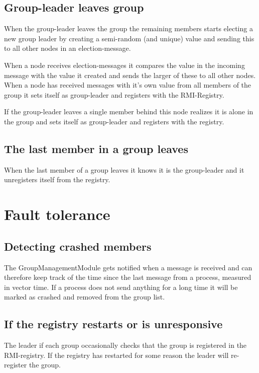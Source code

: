 \documentclass[11pt,swedish]{article}
\begin{document}
\subsection{Group-leader leaves group}
When the group-leader leaves the group the remaining members starts electing a new group leader by creating a semi-random (and unique) value and sending this to all other nodes in an election-message.

When a node receives election-messages it compares the value in the incoming message with the value it created and sends the larger of these to all other nodes. When a node has received messages with it's own value from all members of the group it sets itself as group-leader and registers with the RMI-Registry.

If the group-leader leaves a single member behind this node realizes it is alone in the group and sets itself as group-leader and registers with the registry.

\subsection{The last member in a group leaves}
When the last member of a group leaves it knows it is the group-leader and it unregisters itself from the registry.

\section{Fault tolerance}

\subsection{Detecting crashed members}
The GroupManagementModule gets notified when a message is received and can therefore keep track of the time since the last message from a process, measured in vector time. If a process does not send anything for a long time it will be marked as crashed and removed from the group list.

\subsection{If the registry restarts or is unresponsive}
The leader if each group occasionally checks that the group is registered in the RMI-registry. If the registry has restarted for some reason the leader will re-register the group.
\end{document}
